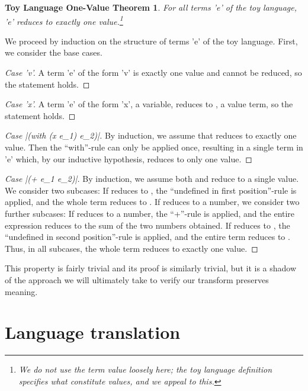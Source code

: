 \documentclass[ms,electronic,twosidetoc,letterpaper,chaptercenter,parttop]{byumsphd}
\begin{document}
\newtheorem*{toythm}{Toy Language One-Value Theorem}
\begin{toythm}
For all terms \scheme'e' of the toy language, \scheme'e' reduces to exactly one value.\footnote{We do 
not use the term \emph{value} loosely here; the toy language definition specifies what 
constitute values, and we appeal to this.}
\end{toythm}
We proceed by induction on the structure of terms \scheme'e' of the toy language. First, we 
consider the base cases.
\begin{proof}[Case \scheme'v']
A term \scheme'e' of the form \scheme'v' is exactly one value and cannot be reduced, 
so the statement holds.
\end{proof}
\begin{proof}[Case \scheme'x']
A term \scheme'e' of the form \scheme'x', a variable, reduces to , 
a value term, so the statement holds.
\end{proof}
\begin{proof}[Case \scheme|(with (x e_1) e_2)|]
By induction, we assume that  reduces to exactly one value. Then the ``with''-rule
can only be applied once, resulting in a single term  in \scheme'e' which, by our
inductive hypothesis, reduces to only one value.
\end{proof}
\begin{proof}[Case \scheme|(+ e_1 e_2)|]
By induction, we assume both  and  reduce to a single value. We 
consider two subcases: If  reduces to , the ``undefined in 
first position''-rule is applied, and the whole term reduces to . If 
 reduces to a number, we consider two further subcases: If  
reduces to a number, the ``+''-rule is applied, and the entire expression reduces to the 
sum of the two numbers obtained. If  reduces to , the 
``undefined in second position''-rule is applied, and the entire term reduces to 
. Thus, in all subcases, the whole term reduces to exactly one value.
\end{proof}

This property is fairly trivial and its proof is similarly trivial, but it is a shadow of 
the approach we will ultimately take to verify our transform preserves meaning.

\section{Language translation}
\end{document}
